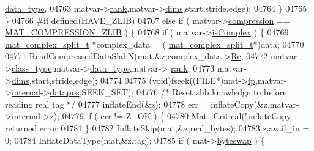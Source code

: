 \begin{DoxyCode}
{{{{{{{{{{{{{{{{{{{{{{{{{{{      \hyperlink{group___m_a_t_ab6aafe9bd77f0f077852593dec438144}{data\_type},
04763                     matvar->\hyperlink{group___m_a_t_a84ba70c96ded13cc555fa75b768d9921}{rank},matvar->\hyperlink{group___m_a_t_a8e01234e1c862ce3472bb37f5a09b92c}{dims},start,stride,edge);
04764             \}
04765         \}
04766 \textcolor{preprocessor}{#if defined(HAVE\_ZLIB)}
04767         \textcolor{keywordflow}{else} \textcolor{keywordflow}{if} ( matvar->\hyperlink{group___m_a_t_aeef0466048621cb2c959ba7f6c774d06}{compression} == \hyperlink{group___m_a_t_gga768c318af97bd2567758ecb001ceb7f4a5181d2f71eab0f12f05ba65d4f13fb53}{MAT\_COMPRESSION\_ZLIB} ) \{
04768             \textcolor{keywordflow}{if} ( matvar->\hyperlink{group___m_a_t_aeb03b3a69f108dc05470b00443a43739}{isComplex} ) \{
04769                 \hyperlink{group___m_a_t_structmat__complex__split__t}{mat\_complex\_split\_t} *complex\_data = (
      \hyperlink{group___m_a_t_structmat__complex__split__t}{mat\_complex\_split\_t}*)data;
04770 
04771                 ReadCompressedDataSlabN(mat,&z,complex\_data->\hyperlink{group___m_a_t_a484a93607508adac2bce53a0252e0325}{Re},
04772                     matvar->\hyperlink{group___m_a_t_aff13035bf3265dd7d9425e5d40c839d4}{class\_type},matvar->\hyperlink{group___m_a_t_ab6aafe9bd77f0f077852593dec438144}{data\_type},matvar->
      \hyperlink{group___m_a_t_a84ba70c96ded13cc555fa75b768d9921}{rank},
04773                     matvar->\hyperlink{group___m_a_t_a8e01234e1c862ce3472bb37f5a09b92c}{dims},start,stride,edge);
04774 
04775                 (void)fseek((FILE*)mat->\hyperlink{struct__mat__t_a85f562e407ca9ad4d2a6e14f839432b7}{fp},matvar->\hyperlink{group___m_a_t_a6e97e3ed9f40c49322c18561c2a94e92}{internal}->\hyperlink{structmatvar__internal_afd3bfaab126a160bd6855563e1ea0a7e}{datapos},SEEK\_SET);
04776                 \textcolor{comment}{/* Reset zlib knowledge to before reading real tag */}
04777                 inflateEnd(&z);
04778                 err = inflateCopy(&z,matvar->\hyperlink{group___m_a_t_a6e97e3ed9f40c49322c18561c2a94e92}{internal}->z);
04779                 \textcolor{keywordflow}{if} ( err != Z\_OK ) \{
04780                     \hyperlink{group__mat__util_gaf51f2bfbb5580f575e4dd79757e2b80c}{Mat\_Critical}(\textcolor{stringliteral}{"inflateCopy returned error %
04781                 \}
04782                 InflateSkip(mat,&z,real\_bytes);
04783                 z.avail\_in = 0;
04784                 InflateDataType(mat,&z,tag);
04785                 \textcolor{keywordflow}{if} ( mat->\hyperlink{struct__mat__t_a99d207977af5e04941ace56d71817a40}{byteswap} ) \{
}}}}}}}}}}}}}}}}}}}}}}}}}}}}
\end{DoxyCode}
